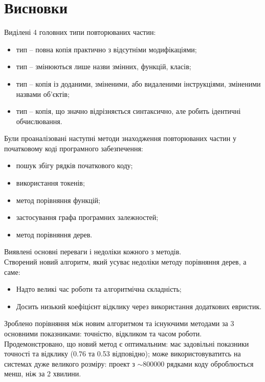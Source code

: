\documentclass[a4paper, 14pt]{article}
\newcommand{\RNum}[1]{\uppercase\expandafter{\romannumeral #1\relax}}
\begin{document}
\section*{Висновки}
Виділені 4 головних типи повторюваних частин:
\begin{itemize}
\item \RNum{1} тип -- повна копія практично з відсутніми модифікаціями;
\item \RNum{2} тип -- змінюються лише назви змінних, функцій, класів;
\item \RNum{3} тип -- копія із доданими, зміненими, або видаленими інструкціями, зміненими назвами об'єктів;
\item \RNum{4} тип -- копія, що значно відрізняється синтаксично, але робить ідентичні обчислювання.
\end{itemize}
Були проаналізовані наступні методи знаходження повторюваних частин у початковому коді програмного забезпечення:
\begin{itemize}
\item пошук збігу рядків початкового коду;
\item використання токенів;
\item метод порівняння функцій;
\item застосування графа програмних залежностей;
\item метод порівняння дерев.
\end{itemize} 
Виявлені основні переваги і недоліки кожного з методів. \\ 
Створений новий алгоритм, який усуває недоліки методу порівняння дерев, а саме:
\begin{itemize}
\item Надто великі час роботи та алгоритмічна складність;
\item Досить низький коефіцієнт відклику через використання додаткових евристик.
\end{itemize}
Зроблено порівняння між новим алгоритмом та існуючими методами за 3 основними показниками: точністю, відкликом та часом роботи. \\
Продемонстровано, що новий метод є оптимальним: має задовільні показники точності та відклику (0.76 та 0.53 відповідно); може використовуватитсь на системах дуже великого розміру: проект з $\sim$800000 рядками коду оброблюється менш, ніж за 2 хвилини.
\newpage
{}
\printbibliography[title={список використаних джерел}]
\end{document}
